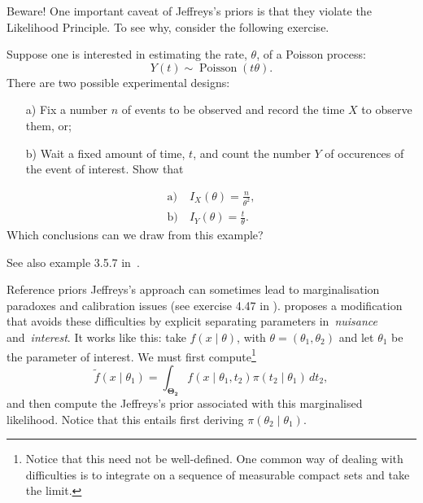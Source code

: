 \begin{frame}{Beware!}
One important caveat of Jeffreys's priors is that they violate the Likelihood Principle.
To see why, consider the following exercise.
\begin{exercise}
Suppose one is interested in estimating the rate, $\theta$, of a Poisson process:
$$ Y(t) \sim \operatorname{Poisson}(t\theta).$$
There are two possible experimental designs: 
\begin{itemize}
 \item[a)] Fix a number $n$ of events to be observed and record the time $X$ to observe them, or;
 \item[b)] Wait a fixed amount of time, $t$, and count the number $Y$ of occurences of the event of interest.
 Show that
\end{itemize}
 \begin{align*}
\label{eq:poisson_process_informationMatrix}
\text{a)}&\:  I_X(\theta) = \frac{n}{\theta^2},\\
\text{b)}&\: I_Y(\theta) = \frac{t}{\theta}.
\end{align*}
Which conclusions can we draw from this example?
\end{exercise}
See also example 3.5.7 in~\cite{Robert2007}.
\end{frame}
\begin{frame}{Reference priors}
Jeffreys's approach can sometimes lead to marginalisation paradoxes and calibration issues (see exercise 4.47 in \cite{Robert2007}).
\cite{Bernardo1979} proposes a modification that avoids these difficulties by explicit separating parameters in~\textit{nuisance} and~\textit{interest}.
It works like this: take $f(x\mid \theta)$, with $\theta = (\theta_1, \theta_2)$ and let $\theta_1$ be the parameter of interest.
We must first compute\footnote{Notice that this need not be well-defined. One common way of dealing with difficulties is to integrate on a sequence of measurable compact sets and take the limit.}
$$ \tilde{f}(x\mid \theta_1) = \int_{\boldsymbol{\Theta_2}} f(x \mid \theta_1, t_2)\pi(t_2\mid \theta_1)\, dt_2, $$
and then compute the Jeffreys's prior associated with this marginalised likelihood.
Notice that this entails first deriving $\pi(\theta_2\mid \theta_1)$.
\end{frame}
